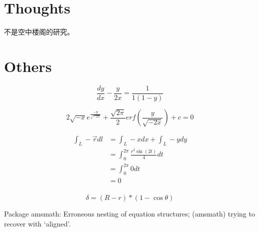 \documentclass[UTF8]{book}
\begin{document}
\chapter{Thoughts}
    不是空中楼阁的研究。



\chapter{Others}


    
\begin{equation}
    \frac{dy}{dx}-\frac{y}{2x}=\frac{1}{1(1-y)}
\end{equation}
     
\begin{equation}
    2\sqrt{-x}e^{\frac{-y}{\sqrt{-2x}}}+
    \frac{\sqrt{2\pi}}{2}erf \left( \frac{y}{\sqrt{-2x}} \right)+c=0
\end{equation}




\begin{equation}
\label{1}
\begin{split}
    \int _L - \vec r dl &=\int _L - x dx+\int _L -  y dy \\
    &=\int _0 ^{2\pi}   \frac {r^2 \sin (2t)}{4}   dt\\
    &=\int _0 ^{2\pi} 0 dt \\
   & =0\\
\end{split}
\end{equation}
 
 


\begin{equation}
\label{}
\delta = (R-r)*(1-\cos \theta)
\end{equation}
 
Package amsmath: Erroneous nesting of equation structures;
(amsmath)	trying to recover with `aligned'.
\end{document}
